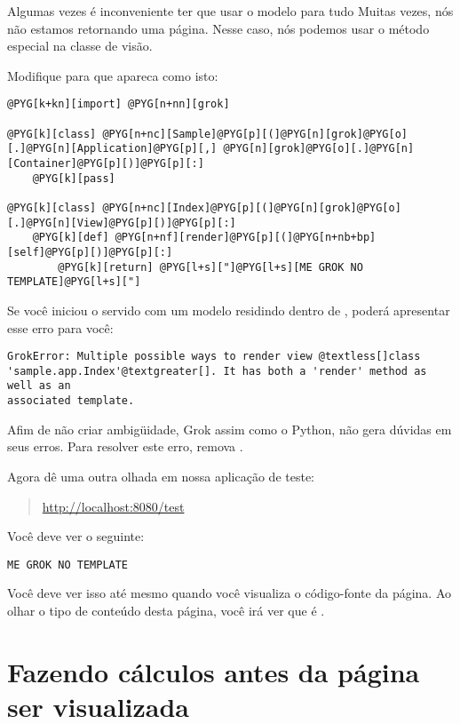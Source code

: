\documentclass[a4paper,12pt,portuguese]{manual}
\begin{document}
Algumas vezes é inconveniente ter que usar o modelo para tudo
Muitas vezes, nós não estamos retornando uma página. Nesse caso,
nós podemos usar o método especial  na classe de visão.

Modifique  para que apareca como isto:

\begin{Verbatim}[commandchars=@\[\]]
@PYG[k+kn][import] @PYG[n+nn][grok]
  
@PYG[k][class] @PYG[n+nc][Sample]@PYG[p][(]@PYG[n][grok]@PYG[o][.]@PYG[n][Application]@PYG[p][,] @PYG[n][grok]@PYG[o][.]@PYG[n][Container]@PYG[p][)]@PYG[p][:]
    @PYG[k][pass]

@PYG[k][class] @PYG[n+nc][Index]@PYG[p][(]@PYG[n][grok]@PYG[o][.]@PYG[n][View]@PYG[p][)]@PYG[p][:]
    @PYG[k][def] @PYG[n+nf][render]@PYG[p][(]@PYG[n+nb+bp][self]@PYG[p][)]@PYG[p][:]
        @PYG[k][return] @PYG[l+s]["]@PYG[l+s][ME GROK NO TEMPLATE]@PYG[l+s]["]
\end{Verbatim}

Se você iniciou o servido com um modelo  residindo dentro
de , poderá apresentar esse erro para você:

\begin{Verbatim}[commandchars=@\[\]]
GrokError: Multiple possible ways to render view @textless[]class
'sample.app.Index'@textgreater[]. It has both a 'render' method as well as an
associated template.
\end{Verbatim}

Afim de não criar ambigüidade, Grok assim como o Python, não gera
dúvidas em seus erros.
Para resolver este erro, remova .

Agora dê uma outra olhada em nossa aplicação de teste:
\begin{quote}

\href{http://localhost:8080/test}{http://localhost:8080/test}
\end{quote}

Você deve ver o seguinte:

\begin{Verbatim}[commandchars=@\[\]]
ME GROK NO TEMPLATE
\end{Verbatim}

Você deve ver isso até mesmo quando você visualiza o código-fonte da página. Ao
olhar o tipo de conteúdo desta página, você irá ver que é .


\section{Fazendo cálculos antes da página ser visualizada}
\end{document}
